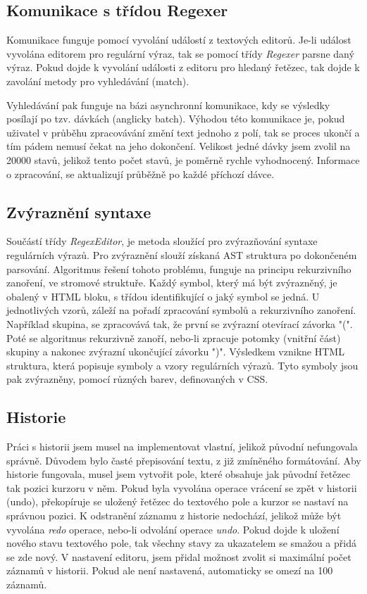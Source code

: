\subsection*{Komunikace s třídou Regexer}

Komunikace funguje pomocí vyvolání událostí z textových editorů.
Je-li událost vyvolána editorem pro regulární výraz, tak se pomocí třídy \textit{Regexer} parsne daný výraz.
Pokud dojde k vyvolání události z editoru pro hledaný řetězec, tak dojde k zavolání metody pro vyhledávání (match).

Vyhledávání pak funguje na bázi asynchronní komunikace, kdy se výsledky posílají po tzv. dávkách (anglicky batch).
Výhodou této komunikace je, pokud uživatel v průběhu zpracovávání změní text jednoho z polí, tak se proces ukončí a tím pádem nemusí čekat na jeho dokončení.
Velikost jedné dávky jsem zvolil na 20000 stavů, jelikož tento počet stavů, je poměrně rychle vyhodnocený.
Informace o zpracování, se aktualizují průběžně po každé příchozí dávce.


\subsection*{Zvýraznění syntaxe}

Součástí třídy \textit{RegexEditor}, je metoda sloužící pro zvýrazňování syntaxe regulárních výrazů. 
Pro zvýraznění slouží získaná AST struktura po dokončeném parsování.
Algoritmus řešení tohoto problému, funguje na principu rekurzivního zanoření, ve stromové struktuře.
Každý symbol, který má být zvýrazněný, je obalený v HTML bloku, s třídou identifikující o jaký symbol se jedná.
U jednotlivých vzorů, záleží na pořadí zpracování symbolů a rekurzivního zanoření.
Například skupina, se zpracovává tak, že první se zvýrazní otevírací závorka "(".
Poté se algoritmus rekurzivně zanoří, nebo-li zpracuje potomky (vnitřní část) skupiny a nakonec zvýrazní ukončující závorku ")".
Výsledkem vznikne HTML struktura, která popisuje symboly a vzory regulárních výrazů.
Tyto symboly jsou pak zvýrazněny, pomocí různých barev, definovaných v CSS.

\subsection*{Historie}
Práci s historii jsem musel na implementovat vlastní, jelikož původní nefungovala správně.
Důvodem bylo časté přepisování textu, z již zmíněného formátování.
Aby historie fungovala, musel jsem vytvořit pole, které obsahuje jak původní řetězec tak pozici kurzoru v něm.
Pokud byla vyvolána operace vrácení se zpět v historii (undo), překopíruje se uložený řetězec do textového pole a kurzor se nastaví na správnou pozici.
K odstranění záznamu z historie nedochází, jelikož může být vyvolána \textit{redo} operace, nebo-li odvolání operace \textit{undo}.
Pokud dojde k uložení nového stavu textového pole, tak všechny stavy za ukazatelem se smažou a přidá se zde nový.
V nastavení editoru, jsem přidal možnost zvolit si maximální počet záznamů v historii.
Pokud ale není nastavená, automaticky se omezí na 100 záznamů.

